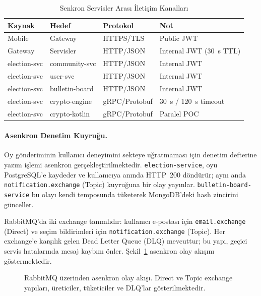\documentclass[a4paper,fleqn]{cas-sc}
\begin{document}
\begin{table}[ht]
\centering
\caption{Senkron Servisler Arası İletişim Kanalları}
\label{tab:communication}
\begin{tabular}{llll}
\toprule
\textbf{Kaynak} & \textbf{Hedef} & \textbf{Protokol} & \textbf{Not} \\
\midrule
Mobile       & Gateway         & HTTPS/TLS   & Public JWT \\
Gateway      & Servisler       & HTTP/JSON   & Internal JWT (30~s TTL) \\
election-svc & community-svc   & HTTP/JSON   & Internal JWT \\
election-svc & user-svc        & HTTP/JSON   & Internal JWT \\
election-svc & bulletin-board  & HTTP/JSON   & Internal JWT \\
election-svc & crypto-engine   & gRPC/Protobuf & 30~s / 120~s timeout \\
election-svc & crypto-kotlin   & gRPC/Protobuf & Paralel POC \\
\bottomrule
\end{tabular}
\end{table}

\paragraph{Asenkron Denetim Kuyruğu.}
Oy gönderiminin kullanıcı deneyimini sekteye uğratmaması için denetim
defterine yazım işlemi asenkron gerçekleştirilmektedir.
\texttt{election-service}, oyu PostgreSQL'e kaydeder ve kullanıcıya anında
HTTP~200 döndürür; aynı anda \texttt{notification.exchange} (Topic)
kuyruğuna bir olay yayınlar.
\texttt{bulletin-board-service} bu olayı kendi temposunda tüketerek
MongoDB'deki hash zincirini günceller.

RabbitMQ'da iki exchange tanımlıdır: kullanıcı e-postası için
\texttt{email.exchange} (Direct) ve seçim bildirimleri için
\texttt{notification.exchange} (Topic).
Her exchange'e karşılık gelen Dead Letter Queue (DLQ) mevcuttur; bu yapı,
geçici servis hatalarında mesaj kaybını önler.
Şekil~\ref{fig:rabbitmq} asenkron olay akışını göstermektedir.

\begin{figure}[ht]
  \centering
  \fbox{\rule{0pt}{4.5cm}\rule{0.85\linewidth}{0pt}}
  \caption{RabbitMQ üzerinden asenkron olay akışı. Direct ve Topic
           exchange yapıları, üreticiler, tüketiciler ve DLQ'lar
           gösterilmektedir.}
  \label{fig:rabbitmq}
\end{figure}
\end{document}
